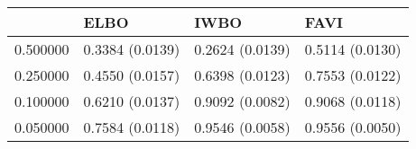 \begin{tabular}{llll}
\toprule
 & ELBO & IWBO & FAVI \\
\midrule
0.500000 & 0.3384 (0.0139) & 0.2624 (0.0139) & 0.5114 (0.0130) \\
0.250000 & 0.4550 (0.0157) & 0.6398 (0.0123) & 0.7553 (0.0122) \\
0.100000 & 0.6210 (0.0137) & 0.9092 (0.0082) & 0.9068 (0.0118) \\
0.050000 & 0.7584 (0.0118) & 0.9546 (0.0058) & 0.9556 (0.0050) \\
\bottomrule
\end{tabular}
